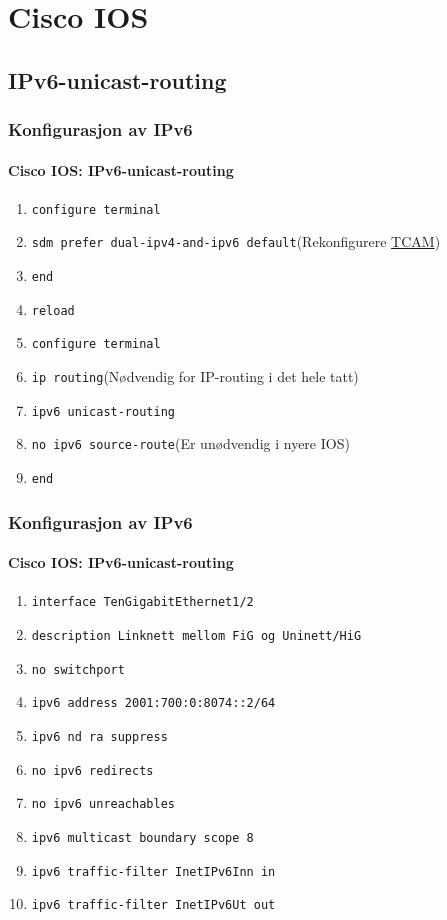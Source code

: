 \section{Cisco IOS}
\subsection{IPv6-unicast-routing}
\begin{frame}%
  \frametitle{Konfigurasjon av IPv6}
  \framesubtitle{Cisco IOS: IPv6-unicast-routing}
  \pause
  \begin{enumerate}[<+->]
  \item \texttt{configure terminal}
  \item \alert{\texttt{sdm prefer dual-ipv4-and-ipv6 default}}\hfill(Rekonfigurere \href{http://en.wikipedia.org/wiki/Content-addressable_memory}{TCAM})
  \item \texttt{end}
  \item \texttt{reload}
  \item \texttt{configure terminal}
  \item \alert{\texttt{ip routing}}\hfill(Nødvendig for IP-routing i det hele tatt)
  \item \alert{\texttt{ipv6 unicast-routing}}
  \item \texttt{no ipv6 source-route}\hfill(Er unødvendig i nyere IOS)
  \item \texttt{end}
  \end{enumerate}
\end{frame}

\begin{frame}%
  \frametitle{Konfigurasjon av IPv6}
  \framesubtitle{Cisco IOS: IPv6-unicast-routing}
  \begin{enumerate}[<+->]
  \item \alert{\texttt{interface TenGigabitEthernet1/2}}
  \item \texttt{description Linknett mellom FiG og Uninett/HiG}
  \item \alert{\texttt{no switchport}}
  \item \alert{\texttt{ipv6 address 2001:700:0:8074::2/64}}
  \item \alert{\texttt{ipv6 nd ra suppress}}
  \item \alert{\texttt{no ipv6 redirects}}
  \item \alert{\texttt{no ipv6 unreachables}}
  \item \alert{\texttt{ipv6 multicast boundary scope 8}}
  \item \alert{\texttt{ipv6 traffic-filter InetIPv6Inn in}}
  \item \alert{\texttt{ipv6 traffic-filter InetIPv6Ut out}}
  \end{enumerate}
\end{frame}

